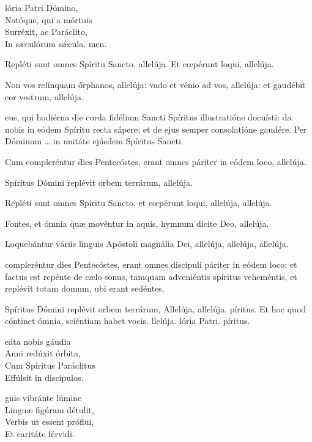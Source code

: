 \documentclass[fontsize=9pt,paper=A6,twoside,BCOR=1mm,DIV=22,headinclude]{scrarticle}
\begin{document}
\begin{multicols}{2}
\begin{hymnus}
lória Patri Dómino,\\
Natóque, qui a mórtuis\\
Surréxit, ac Paráclito,\\
In sæculórum sǽcula.
men.
\end{hymnus}


\V Repléti sunt omnes Spíritu Sancto, allelúja.
\R Et cœpérunt loqui, allelúja.

\M Non vos relínquam \f órphanos, allelúja: vado et vénio ad vos, allelúja: et gaudébit cor vestrum, allelúja.

eus, qui hodiérna die corda fidélium Sancti Spíritus illustratióne docuísti: da nobis in eódem Spíritu recta sápere; et de ejus semper consolatióne gaudére. Per Dóminum … in unitáte ejúsdem Spíritus Sancti.

\etper

 Cum compleréntur \f dies Pentecóstes, erant omnes páriter in eódem loco, allelúja.
\Dominusregnavit

 Spíritus Dómini \f replévit orbem terrárum, allelúja.

 Repléti sunt omnes \f Spíritu Sancto, et cœpérunt loqui, allelúja, allelúja.

 Fontes, et ómnia \f quæ movéntur in aquis, hymnum dícite Deo, allelúja.

 Loquebántur \f váriis linguis Apóstoli magnália Dei, allelúja, allelúja, allelúja.

 compleréntur dies Pentecóstes, erant omnes discípuli páriter in eódem loco: et factus est repénte de cælo sonus, tamquam adveniéntis spíritus veheméntis, et replévit totam domum, ubi erant sedéntes.

\Rbr Spíritus Dómini replévit orbem terrárum, \red{*} Allelúja, allelúja.
píritus.
\V Et hoc quod cóntinet ómnia, sciéntiam habet vocis.
llelúja.
lória Patri.
píritus.

\begin{hymnus}
	eáta nobis gáudia\\
	\hspace{1.6em} Anni redúxit órbita,\\
Cum Spíritus Paráclitus\\
Effúlsit in discípulos.

gnis vibránte lúmine\\
Linguæ figúram détulit,\\
Verbis ut essent próflui,\\
Et caritáte férvidi.


\end{hymnus}
\end{multicols}
\end{document}
